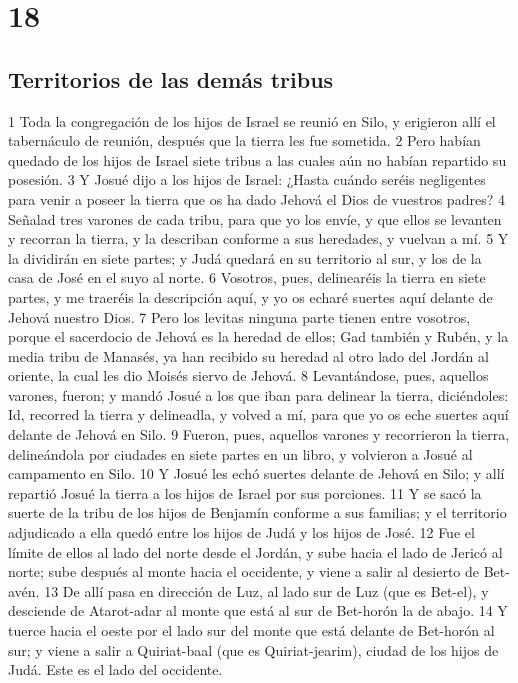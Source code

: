 \chapter{18}

\section*{Territorios de las demás tribus}


1 Toda la congregación de los hijos de Israel se reunió en Silo, y erigieron allí el tabernáculo de reunión, después que la tierra les fue sometida.
2 Pero habían quedado de los hijos de Israel siete tribus a las cuales aún no habían repartido su posesión.
3 Y Josué dijo a los hijos de Israel: ¿Hasta cuándo seréis negligentes para venir a poseer la tierra que os ha dado Jehová el Dios de vuestros padres?
4 Señalad tres varones de cada tribu, para que yo los envíe, y que ellos se levanten y recorran la tierra, y la describan conforme a sus heredades, y vuelvan a mí.
5 Y la dividirán en siete partes; y Judá quedará en su territorio al sur, y los de la casa de José en el suyo al norte.
6 Vosotros, pues, delinearéis la tierra en siete partes, y me traeréis la descripción aquí, y yo os echaré suertes aquí delante de Jehová nuestro Dios.
7 Pero los levitas ninguna parte tienen entre vosotros, porque el sacerdocio de Jehová es la heredad de ellos; Gad también y Rubén, y la media tribu de Manasés, ya han recibido su heredad al otro lado del Jordán al oriente, la cual les dio Moisés siervo de Jehová.
8 Levantándose, pues, aquellos varones, fueron; y mandó Josué a los que iban para delinear la tierra, diciéndoles: Id, recorred la tierra y delineadla, y volved a mí, para que yo os eche suertes aquí delante de Jehová en Silo.
9 Fueron, pues, aquellos varones y recorrieron la tierra, delineándola por ciudades en siete partes en un libro, y volvieron a Josué al campamento en Silo.
10 Y Josué les echó suertes delante de Jehová en Silo; y allí repartió Josué la tierra a los hijos de Israel por sus porciones.
11 Y se sacó la suerte de la tribu de los hijos de Benjamín conforme a sus familias; y el territorio adjudicado a ella quedó entre los hijos de Judá y los hijos de José.
12 Fue el límite de ellos al lado del norte desde el Jordán, y sube hacia el lado de Jericó al norte; sube después al monte hacia el occidente, y viene a salir al desierto de Bet-avén.
13 De allí pasa en dirección de Luz, al lado sur de Luz (que es Bet-el), y desciende de Atarot-adar al monte que está al sur de Bet-horón la de abajo.
14 Y tuerce hacia el oeste por el lado sur del monte que está delante de Bet-horón al sur; y viene a salir a Quiriat-baal (que es Quiriat-jearim), ciudad de los hijos de Judá. Este es el lado del occidente.

